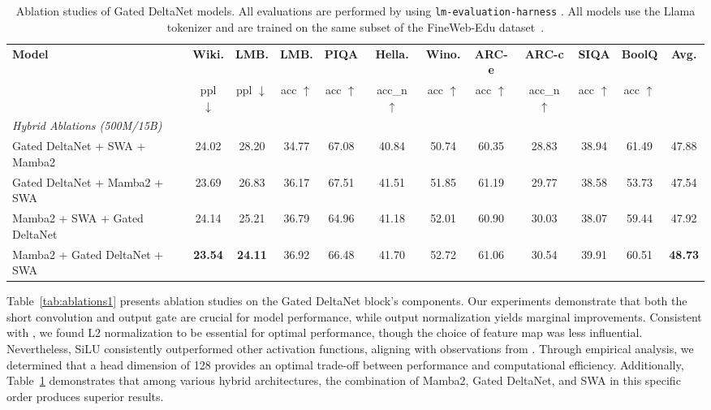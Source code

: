 \documentclass{article}
\begin{document}
\begin{table}[!h]
\centering
\scriptsize
\addtolength{\tabcolsep}{-2.5pt}    
\begin{tabular}{l|cc|ccccccccc}
\toprule
\textbf{Model}  & \textbf{Wiki.}  &  \textbf{LMB.} &  \textbf{LMB.} & \textbf{PIQA} &    \textbf{Hella.} & \textbf{Wino.} & \textbf{ARC-e} &  \textbf{ARC-c} &  \textbf{SIQA}  & \textbf{BoolQ} &  \textbf{Avg.} \\
 & ppl $\downarrow$  &  ppl $\downarrow$  &  acc $\uparrow$  & acc $\uparrow$ &   acc\_n $\uparrow$  & acc $\uparrow$  & acc $\uparrow$ & acc\_n $\uparrow$ &  acc $\uparrow$  & acc $\uparrow$ &     \\

\midrule
{\textit{Hybrid Ablations (500M/15B)}} \\
\midrule
\hspace{2mm} Gated DeltaNet + SWA + Mamba2 & 24.02 & 28.20 & 34.77 & 67.08 & 40.84 &	50.74 & 60.35	& 28.83 &  38.94  & 61.49  & 47.88 \\
\hspace{2mm} Gated DeltaNet + Mamba2 + SWA & 23.69 & 26.83 & 36.17 & 67.51 & 41.51 &	51.85 & 61.19	& 29.77 &  38.58  & 53.73  & 47.54 \\
\hspace{2mm} Mamba2 + SWA + Gated DeltaNet & 24.14 & 25.21 & 36.79 & 64.96 & 41.18 &	52.01 & 60.90	& 30.03 &  38.07  & 59.44  & 47.92 \\
\hspace{2mm}  Mamba2 + Gated DeltaNet + SWA & \textbf{23.54} & \textbf{24.11} & 36.92 & 66.48 & 41.70 &	52.72 & 61.06	& 30.54 &  39.91  & 60.51  & \textbf{48.73} \\
\bottomrule
\end{tabular}
\addtolength{\tabcolsep}{2.5pt}    
\centering
\caption{Ablation studies of Gated DeltaNet models. All evaluations are performed by using \texttt{lm-evaluation-harness} \citep{eval-harness}. All models use the Llama tokenizer and are trained on the same subset of the FineWeb-Edu dataset~\citep{penedo2024fineweb}.
}
\label{tab:hybrid_design_ablations}
\end{table}

Table~\ref{tab:ablations1} presents ablation studies on the Gated DeltaNet block's components. Our experiments demonstrate that both the short convolution and output gate are crucial for model performance, while output normalization yields marginal improvements. Consistent with \citet{yang2024parallelizing}, we found L2 normalization to be essential for optimal performance, though the choice of feature map was less influential. Nevertheless, SiLU consistently outperformed other activation functions, aligning with observations from \citet{Qin2023TransNormerLLMAF}. Through empirical analysis, we determined that a head dimension of 128 provides an optimal trade-off between performance and computational efficiency. Additionally, Table~\ref{tab:hybrid_design_ablations} demonstrates that among various hybrid architectures, the combination of Mamba2, Gated DeltaNet, and SWA in this specific order produces superior results.
\end{document}
